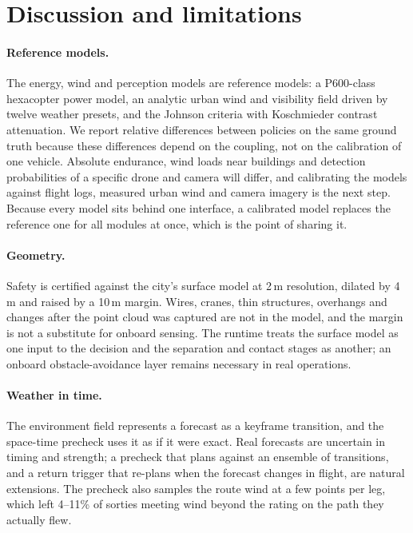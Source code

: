 \section{Discussion and limitations}\label{sec:discussion}

\paragraph{Reference models.} The energy, wind and perception models are reference models: a P600-class hexacopter
power model, an analytic urban wind and visibility field driven by twelve weather presets, and the Johnson criteria with
Koschmieder contrast attenuation. We report relative differences between policies on the same ground truth because
these differences depend on the coupling, not on the calibration of one vehicle. Absolute endurance, wind loads near
buildings and detection probabilities of a specific drone and camera will differ, and calibrating the models against
flight logs, measured urban wind and camera imagery is the next step. Because every model sits behind one interface,
a calibrated model replaces the reference one for all modules at once, which is the point of sharing it.

\paragraph{Geometry.} Safety is certified against the city's surface model at 2\,m resolution, dilated by 4\,m and
raised by a 10\,m margin. Wires, cranes, thin structures, overhangs and changes after the point cloud was captured are
not in the model, and the margin is not a substitute for onboard sensing. The runtime treats the surface model as one
input to the decision and the separation and contact stages as another; an onboard obstacle-avoidance layer remains
necessary in real operations.

\paragraph{Weather in time.} The environment field represents a forecast as a keyframe transition, and the space-time
precheck uses it as if it were exact. Real forecasts are uncertain in timing and strength; a precheck that plans
against an ensemble of transitions, and a return trigger that re-plans when the forecast changes in flight, are natural
extensions. The precheck also samples the route wind at a few points per leg, which left 4--11\% of sorties meeting
wind beyond the rating on the path they actually flew.

